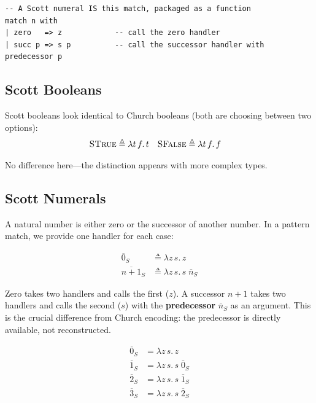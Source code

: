 \documentclass[11pt,a4paper]{article}
\theoremstyle{definition}
\newcommand{\lam}{\lambda}
\newcommand{\church}[1]{\overline{#1}}
\begin{document}
\begin{verbatim}
-- A Scott numeral IS this match, packaged as a function
match n with
| zero   => z            -- call the zero handler
| succ p => s p          -- call the successor handler with predecessor p
\end{verbatim}

\subsection{Scott Booleans}

Scott booleans look identical to Church booleans (both are choosing between
two options):
\begin{align*}
\textsc{STrue}  &\triangleq \lam t\, f.\, t &
\textsc{SFalse} &\triangleq \lam t\, f.\, f
\end{align*}

No difference here---the distinction appears with more complex types.

\subsection{Scott Numerals}

A natural number is either zero or the successor of another number. In a
pattern match, we provide one handler for each case:

\begin{defnbox}
\vspace{-0.8em}
\begin{align*}
\church{0}_S &\triangleq \lam z\, s.\, z \\
\church{n+1}_S &\triangleq \lam z\, s.\, s\;\church{n}_S
\end{align*}
\end{defnbox}

Zero takes two handlers and calls the first ($z$). A successor $n+1$ takes
two handlers and calls the second ($s$) with the \textbf{predecessor}
$\church{n}_S$ as an argument. This is the crucial difference from Church
encoding: the predecessor is directly available, not reconstructed.

\begin{align*}
\church{0}_S &= \lam z\, s.\, z \\
\church{1}_S &= \lam z\, s.\, s\;\church{0}_S \\
\church{2}_S &= \lam z\, s.\, s\;\church{1}_S \\
\church{3}_S &= \lam z\, s.\, s\;\church{2}_S
\end{align*}
\end{document}
